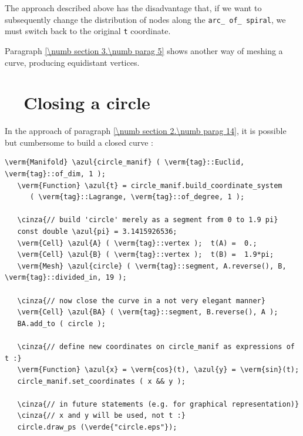 The approach described above has the disadvantage that, if we want to subsequently change the
distribution of nodes along the {\small\tt arc\_\,of\_\,spiral}, we must switch back to the original
{\small\tt t} coordinate.

Paragraph \ref{\numb section 3.\numb parag 5} shows another way of meshing a curve,
producing equidistant vertices.


\section{~~Closing a circle}\label{\numb section 2.\numb parag 15}

In the approach of paragraph \ref{\numb section 2.\numb parag 14}, it is possible but cumbersome to
build a closed curve :

\begin{Verbatim}[commandchars=\\\{\},formatcom=\small\tt,frame=single,
   label=parag-\ref{\numb section 2.\numb parag 15}.cpp,rulecolor=\color{coment},
   baselinestretch=0.94,framesep=2mm]
   \verm{Manifold} \azul{circle_manif} ( \verm{tag}::Euclid, \verm{tag}::of_dim, 1 );
   \verm{Function} \azul{t} = circle_manif.build_coordinate_system
      ( \verm{tag}::Lagrange, \verm{tag}::of_degree, 1 );

   \cinza{// build 'circle' merely as a segment from 0 to 1.9 pi}
   const double \azul{pi} = 3.1415926536;
   \verm{Cell} \azul{A} ( \verm{tag}::vertex );  t(A) =  0.;
   \verm{Cell} \azul{B} ( \verm{tag}::vertex );  t(B) =  1.9*pi;
   \verm{Mesh} \azul{circle} ( \verm{tag}::segment, A.reverse(), B, \verm{tag}::divided_in, 19 );

   \cinza{// now close the curve in a not very elegant manner}
   \verm{Cell} \azul{BA} ( \verm{tag}::segment, B.reverse(), A );
   BA.add_to ( circle );

   \cinza{// define new coordinates on circle_manif as expressions of t :}
   \verm{Function} \azul{x} = \verm{cos}(t), \azul{y} = \verm{sin}(t);
   circle_manif.set_coordinates ( x && y );

   \cinza{// in future statements (e.g. for graphical representation)}
   \cinza{// x and y will be used, not t :}
   circle.draw_ps (\verde{"circle.eps"});
\end{Verbatim}


